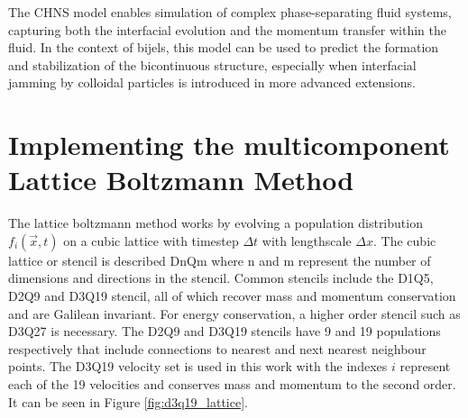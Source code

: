 The CHNS model enables simulation of complex phase-separating fluid systems, capturing both the interfacial evolution and the momentum transfer within the fluid. In the context of bijels, this 
model can be used to predict the formation and stabilization of the bicontinuous structure, especially when interfacial jamming by colloidal particles is introduced in more advanced extensions.

\section{Implementing the multicomponent Lattice Boltzmann Method} 
\label{section:lbm_hydrodynamics}

The lattice boltzmann method works by evolving a population distribution $f_{i}(\vec{x}, t)$ on a cubic lattice with 
timestep $\Delta t$ with lengthscale $\Delta x$. \cite{qian_lattice_1992, succi_lattice_2018, he_theory_1997} The cubic lattice or stencil is described
DnQm where n and m represent the number of dimensions and directions in the stencil. \cite{succi_lattice_2018, schmieschek_lb3d_2017}
Common stencils include the D1Q5, D2Q9 and D3Q19 stencil, all of which recover mass and momentum conservation and are Galilean invariant.
For energy conservation, a higher order stencil such as D3Q27 is necessary. The D2Q9 and D3Q19 stencils have 9 and 19 populations respectively that include 
connections to nearest and next nearest neighbour points. The D3Q19 
velocity set is used in this work with the indexes $i$ represent each of the 19 velocities and conserves mass and momentum 
to the second order. It can be seen in Figure \ref{fig:d3q19_lattice}. 

